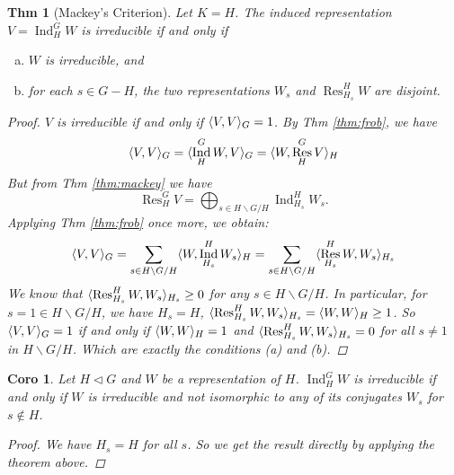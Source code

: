 \documentclass[a4paper]{article}
\DeclarePairedDelimiter{\inpd}{\langle}{\rangle} %
\DeclareMathOperator{\Res}{Res}
\DeclareMathOperator{\Ind}{Ind}
\newcommand*\bsl{\backslash}
\theoremstyle{mystyle}
\newtheorem{theorem}{Thm}
\newtheorem{coro}{Coro}
\begin{document}
\begin{theorem}[Mackey's Criterion]
  Let $K = H$. The induced representation $V = \Ind^G_H W$ is irreducible
  if and only if
  \begin{enumerate}[(a)]
    \item $W$ is irreducible, and
    \item for each $s\in G - H$, the two representations $W_s$
      and $\Res^H_{H_s} W$ are disjoint.
  \end{enumerate}
  \begin{proof}
    $V$ is irreducible if and only if $\inpd{V, V}_G = 1$.
    By Thm \ref{thm:frob}, we have
    \[ \inpd{V, V}_G = \inpd{\Ind^G_H W, V}_G = \inpd{W, \Res^G_H V}_H \]
    But from Thm \ref{thm:mackey} we have
    \[ \Res^G_H V = \bigoplus_{s\in H\bsl G/H} \Ind^H_{H_s} W_s. \]
    Applying Thm \ref{thm:frob} once more, we obtain:
    \[ \inpd{V, V}_G = \sum_{s\in H\bsl G/H} \inpd{W, \Ind^H_{H_s} W_s}_H
      = \sum_{s\in H\bsl G/H} \inpd{\Res^H_{H_s} W, W_s}_{H_s}
    \]
    We know that $\inpd{\Res^H_{H_s} W, W_s}_{H_s} \ge 0$ for any
    $s\in H\bsl G/H$.
    In particular, for $s = 1 \in H\bsl G/H$, we have $H_s = H$,
    $\inpd{\Res^H_{H_s} W, W_s}_{H_s} = \inpd{W, W}_H \ge 1$.
    So $\inpd{V, V}_G = 1$ if and only if
    $\inpd{W, W}_H = 1$ and $\inpd{\Res^H_{H_s} W, W_s}_{H_s} = 0$
    for all $s\ne 1$ in $H\bsl G/H$.
    Which are exactly the conditions (a) and (b).
  \end{proof}
\end{theorem}

\begin{coro}
  Let $H \lhd G$ and $W$ be a representation of $H$. $\Ind^G_H W$ is
  irreducible if and only if $W$ is irreducible and not isomorphic to
  any of its conjugates $W_s$ for $s \not\in H$.
  \begin{proof}
    We have $H_s = H$ for all $s$. So we get the result directly by
    applying the theorem above.
  \end{proof}
\end{coro}
% 
% 
\end{document}
